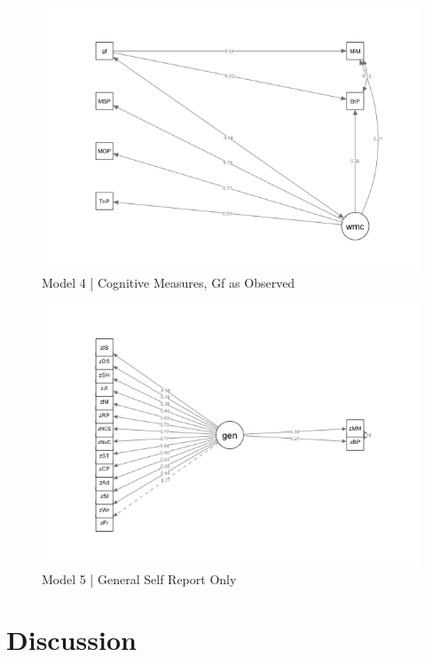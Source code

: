 \documentclass[12pt,]{book}
\begin{document}
\begin{figure}

{\centering \includegraphics[width=1\linewidth]{img/sem4} 

}

\caption{Model 4 | Cognitive Measures, Gf as Observed}\label{fig:model4}
\end{figure}

\begin{figure}

{\centering \includegraphics[width=1\linewidth]{img/sem5} 

}

\caption{Model 5 | General Self Report Only}\label{fig:model5}
\end{figure}

\hypertarget{discussion}{%
\section{Discussion}\label{discussion}}
\end{document}
